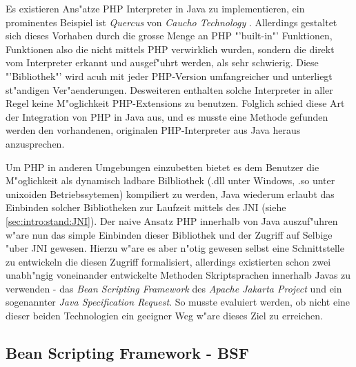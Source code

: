 Es existieren Ans"atze PHP Interpreter in Java zu implementieren, ein prominentes Beispiel
ist \emph{Quercus} von \emph{Caucho Technology} \cite{CAUCHOHP}. Allerdings gestaltet sich dieses Vorhaben durch
die grosse Menge an PHP "'built-in"' Funktionen, Funktionen also die nicht mittels PHP verwirklich wurden, 
sondern die direkt vom Interpreter erkannt und ausgef"uhrt werden, als sehr schwierig. Diese "'Bibliothek"' wird
acuh mit jeder PHP-Version umfangreicher und unterliegt  st"andigen Ver"aenderungen. Desweiteren enthalten solche
Interpreter in aller Regel keine M"oglichkeit PHP-Extensions zu benutzen. Folglich schied diese Art der
Integration von PHP in Java aus, und es musste eine Methode gefunden werden den vorhandenen, originalen PHP-Interpreter
aus Java heraus anzusprechen.

Um PHP in anderen Umgebungen einzubetten bietet es dem Benutzer die M"oglichkeit als dynamisch ladbare
Bilbliothek (.dll unter Windows, .so unter unixoiden Betriebssytemen) kompiliert zu werden, Java wiederum
erlaubt das Einbinden solcher Bibliotheken zur Laufzeit mittels des JNI (siehe \ref{sec:intro:stand:JNI}).
Der naive Ansatz PHP innerhalb von Java auszuf"uhren w"are nun das simple Einbinden dieser Bibliothek und
der Zugriff auf Selbige "uber JNI gewesen. Hierzu w"are es aber n"otig gewesen selbst eine Schnittstelle 
zu entwickeln die diesen Zugriff formalisiert, allerdings existierten schon zwei unabh"ngig voneinander entwickelte
Methoden Skriptsprachen innerhalb Javas zu verwenden - das \emph{Bean Scripting Framework} des \emph{Apache
Jakarta Project} und ein sogenannter \emph{Java Specification Request}. So musste evaluiert werden, ob nicht
eine dieser beiden Technologien ein geeigner Weg w"are dieses Ziel zu erreichen. 

\subsection{Bean Scripting Framework - BSF}
\label{sec:chap1:ana:bsf}

